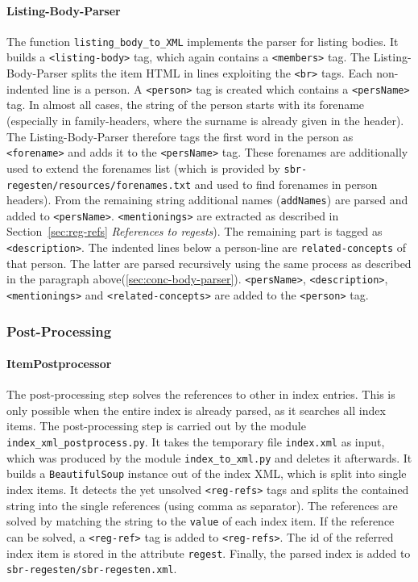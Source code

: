 \paragraph{Listing-Body-Parser}
The function \texttt{listing\_body\_to\_XML} implements the parser for
listing bodies. It builds a \texttt{<listing-body>} tag, which again
contains a \texttt{<members>} tag. The Listing-Body-Parser splits the
item HTML in lines exploiting the \texttt{<br>} tags. Each
non-indented line is a person. A \texttt{<person>} tag is created
which contains a \texttt{<persName>} tag. In almost all cases, the
string of the person starts with its forename (especially in
family-headers, where the surname is already given in the header). The
Listing-Body-Parser therefore tags the first word in the person as
\texttt{<forename>} and adds it to the \texttt{<persName>} tag. These
forenames are additionally used to extend the forenames list (which is
provided by \texttt{sbr-regesten/resources/forenames.txt} and used to
find forenames in person headers). From the remaining string
additional names (\texttt{addNames}) are parsed and added to
\texttt{<persName>}. \texttt{<mentionings>} are extracted as described
in Section~\ref{sec:reg-refs} \textit{References to regests}). The
remaining part is tagged as \texttt{<description>}. The indented lines
below a person-line are \texttt{related-concepts} of that person. The
latter are parsed recursively using the same process as described in
the paragraph above(\ref{sec:conc-body-parser}). \texttt{<persName>},
\texttt{<description>}, \texttt{<mentionings>} and
\texttt{<related-concepts>} are added to the \texttt{<person>} tag.

\subsubsection{Post-Processing}

\paragraph{ItemPostprocessor}
\label{sec:postproc}
The post-processing step solves the references to other in index
entries. This is only possible when the entire index is already
parsed, as it searches all index items. The post-processing step is
carried out by the module \texttt{index\_xml\_postprocess.py}. It
takes the temporary file \texttt{index.xml} as input, which was
produced by the module \texttt{index\_to\_xml.py} and deletes it
afterwards. It builds a \texttt{BeautifulSoup} instance out of the
index XML, which is split into single index items. It detects the yet
unsolved \texttt{<reg-refs>} tags and splits the contained string into
the single references (using comma as separator). The references are
solved by matching the string to the \texttt{value} of each index
item. If the reference can be solved, a \texttt{<reg-ref>} tag is
added to \texttt{<reg-refs>}. The id of the referred index item is
stored in the attribute \texttt{regest}. Finally, the parsed index is
added to \texttt{sbr-regesten/sbr-regesten.xml}.

